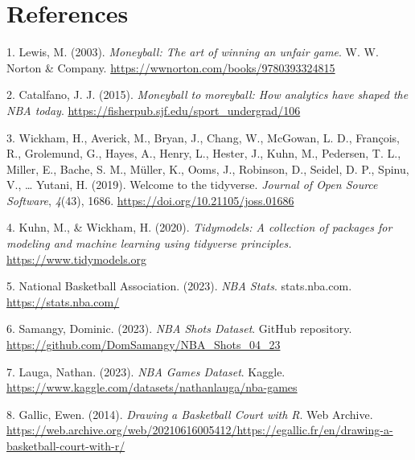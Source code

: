 \documentclass[
  12pt,
  a4paper,
]{article}
\newlength{\cslhangindent}
\newlength{\cslentryspacingunit} %
\newenvironment{CSLReferences}[2] %
 {%
  \setlength{\parindent}{0pt}
  \ifodd #1
  \let\oldpar\par
  \def\par{\hangindent=\cslhangindent\oldpar}
  \fi
  \setlength{\parskip}{#2\cslentryspacingunit}
 }%
 {}
\begin{document}
\hypertarget{references}{%
\section*{References}\label{references}}


\hypertarget{refs}{}
\begin{CSLReferences}{1}{0}
\leavevmode{}%
1. Lewis, M. (2003). \emph{Moneyball: The art of winning an unfair game}. W. W. Norton \& Company. \url{https://wwnorton.com/books/9780393324815}

\leavevmode{}%
2. Catalfano, J. J. (2015). \emph{Moneyball to moreyball: How analytics have shaped the NBA today}. \url{https://fisherpub.sjf.edu/sport_undergrad/106}

\leavevmode{}%
3. Wickham, H., Averick, M., Bryan, J., Chang, W., McGowan, L. D., François, R., Grolemund, G., Hayes, A., Henry, L., Hester, J., Kuhn, M., Pedersen, T. L., Miller, E., Bache, S. M., Müller, K., Ooms, J., Robinson, D., Seidel, D. P., Spinu, V., \ldots{} Yutani, H. (2019). Welcome to the {tidyverse}. \emph{Journal of Open Source Software}, \emph{4}(43), 1686. \url{https://doi.org/10.21105/joss.01686}

\leavevmode{}%
4. Kuhn, M., \& Wickham, H. (2020). \emph{Tidymodels: A collection of packages for modeling and machine learning using tidyverse principles.} \url{https://www.tidymodels.org}

\leavevmode{}%
5. National Basketball Association. (2023). \emph{{NBA Stats}}. {stats.nba.com}. \url{https://stats.nba.com/}

\leavevmode{}%
6. Samangy, Dominic. (2023). \emph{{NBA Shots Dataset}}. {GitHub repository}. \url{https://github.com/DomSamangy/NBA_Shots_04_23}

\leavevmode{}%
7. Lauga, Nathan. (2023). \emph{{NBA Games Dataset}}. {Kaggle}. \url{https://www.kaggle.com/datasets/nathanlauga/nba-games}

\leavevmode{}%
8. Gallic, Ewen. (2014). \emph{{Drawing a Basketball Court with R}}. {Web Archive}. \url{https://web.archive.org/web/20210616005412/https://egallic.fr/en/drawing-a-basketball-court-with-r/}


\end{CSLReferences}
\end{document}
